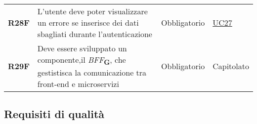 \begin{center}
\begin{longtable}[!h]{p{50px} p{245px} p{75px} p{50px}}
        \textbf{R28F}                         & L'utente deve poter visualizzare un errore se inserisce dei dati sbagliati durante l'autenticazione                                                    & Obbligatorio             & \hyperref[sec:UC27]{UC27}                    \\
        \textbf{R29F}                         & Deve essere sviluppato un componente,\newline il \textit{BFF}\textsubscript{\textbf{G}}, che gestistisca la comunicazione tra front-end e microservizi & Obbligatorio             & Capitolato                                   \\
    \end{longtable}
\end{center}

\newpage
\subsection{Requisiti di qualità}
